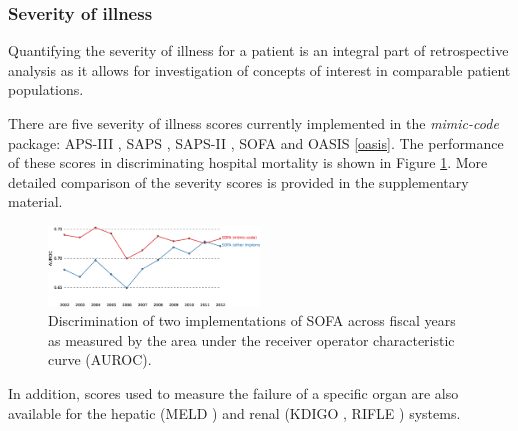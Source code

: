 \documentclass{bioinfo}
\begin{document}
\begin{methods}

\subsubsection{Severity of illness}



Quantifying the severity of illness for a patient is an integral part of retrospective analysis as it allows for investigation of concepts of interest in comparable patient populations. 

There are five severity of illness scores currently implemented in the \emph{mimic-code} package: APS-III \cite{aps}, SAPS \cite{saps}, SAPS-II \cite{sapsii}, SOFA \cite{sofa} and OASIS \ref{oasis}. The performance of these scores in discriminating hospital mortality is shown in Figure \ref{fig:SevScoresOverTime}. More detailed comparison of the severity scores is provided in the supplementary material.

\begin{figure}[!tpb]%
\centerline{\includegraphics[width=0.5\textwidth]{SOFA.eps}}
\caption{Discrimination of two implementations of SOFA across fiscal years as measured by the area under the receiver operator characteristic curve (AUROC).}\label{fig:SevScoresOverTime}
\end{figure}

In addition, scores used to measure the failure of a specific organ are also available for the hepatic (MELD \cite{meld}) and renal (KDIGO \cite{kdigo}, RIFLE \cite{rifle}) systems.



\end{methods}
\end{document}
